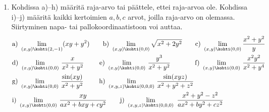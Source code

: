 \Harj
\begin{enumerate}

\item
Kohdissa a)--h) määritä raja-arvo tai päättele, ettei raja-arvoa ole. Kohdissa i)--j) määritä
kaikki kertoimien $a,b,c$ arvot, joilla raja-arvo on olemassa. Siirtyminen napa- tai 
pallokoordinaatistoon voi auttaa.
\begin{align*}
&\text{a)}\ \lim_{(x,y)\kohti(2,-1)} (xy+y^2) \qquad 
 \text{b)}\ \lim_{(x,y)\kohti(0,0)} \sqrt{x^2+2y^2} \qquad
 \text{c)}\ \lim_{(x,y)\kohti(0,0)} \frac{x^2+y^2}{y} \\
&\text{d)}\ \lim_{(x,y)\kohti(0,0)}\,\frac{x}{x^2+y^2} \qquad\ 
 \text{e)}\ \lim_{(x,y)\kohti(0,0)}\,\frac{y^3}{x^2+y^2} \qquad\quad\ \
 \text{f)}\ \lim_{(x,y)\kohti(0,0)}\,\frac{x^2y^2}{x^2+y^4} \\
&\text{g)}\ \lim_{(x,y)\kohti(0,0)}\,\frac{\sin(xy)}{x^2+y^2} \qquad\ 
 \text{h)}\ \lim_{(x,y,z)\kohti(0,0,0)}\,\frac{\sin(xyz)}{x^2+y^2+z^2} \\
&\text{i)}\ \lim_{(x,y)\kohti(0,0)}\,\frac{xy}{ax^2+bxy+cy^2} \qquad
 \text{j)}\ \lim_{(x,y,z)\kohti(0,0,0)}\ \frac{x^2+y^2-z^2}{ax^2+by^2+cz^2}
\end{align*}


\end{enumerate}
